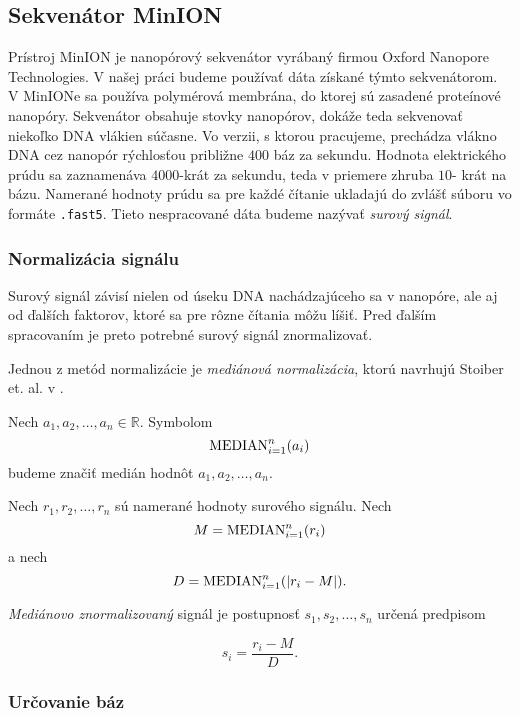 
\subsection{Sekvenátor MinION}

Prístroj MinION je nanopórový sekvenátor vyrábaný firmou Oxford Nanopore Technologies. V našej práci 
budeme používať dáta získané týmto sekvenátorom. V MinIONe sa používa polymérová membrána, do ktorej sú 
zasadené proteínové nanopóry. Sekvenátor obsahuje stovky nanopórov, dokáže teda sekvenovať niekoľko DNA 
vlákien súčasne.
Vo verzii, s ktorou pracujeme, prechádza vlákno DNA cez nanopór rýchlosťou približne $400$ báz za 
sekundu. Hodnota elektrického prúdu sa zaznamenáva $4000$-krát za sekundu, teda v priemere zhruba $10$-
krát na bázu. Namerané hodnoty prúdu sa pre každé čítanie ukladajú do zvlášť súboru vo formáte 
\texttt{.fast5}. Tieto nespracované dáta budeme nazývať \emph{surový signál}.


\subsubsection{Normalizácia signálu}

Surový signál závisí nielen od úseku DNA nachádzajúceho sa v nanopóre, ale aj od ďalších faktorov, ktoré 
sa pre rôzne čítania môžu líšiť. Pred ďalším spracovaním je preto potrebné surový signál znormalizovať.

Jednou z metód normalizácie je \emph{mediánová normalizácia}, ktorú navrhujú Stoiber et. al. v 
\cite{Stoiber2017}.

\begin{definicia}
Nech $a_1, a_2, \dots, a_n \in \mathbb{R}$. Symbolom
$$\median{i=1}{n}(a_i)$$
budeme značiť medián hodnôt $a_1, a_2, \dots, a_n$.
\end{definicia}

\begin{definicia}
Nech $r_1, r_2, \dots, r_n$ sú namerané hodnoty surového signálu. Nech
 $$M = \median{i=1}{n}(r_i)$$ a nech $$D = \median{i=1}{n}(\abs*{r_i - M}) \text{.}$$

\emph{Mediánovo znormalizovaný} signál je postupnosť $s_1, s_2, \dots, s_n$ určená predpisom

$$s_i = \frac{r_i - M}{D} \text{.}$$

\end{definicia}

\subsubsection{Určovanie báz}


